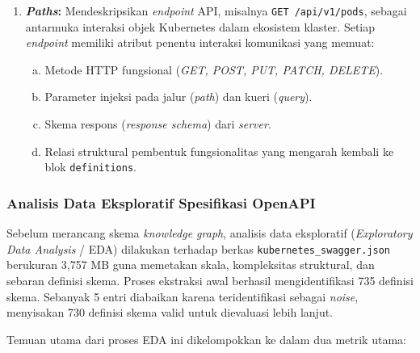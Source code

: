 \begin{enumerate}
        \item \textbf{\textit{Paths}:} Mendeskripsikan \textit{endpoint} API, misalnya \texttt{GET /api/v1/pods}, sebagai antarmuka interaksi objek Kubernetes dalam ekosistem klaster. Setiap \textit{endpoint} memiliki atribut penentu interaksi komunikasi yang memuat:
        \begin{enumerate}[a.]
            \item Metode HTTP fungsional (\textit{GET, POST, PUT, PATCH, DELETE}).
            \item Parameter injeksi pada jalur (\textit{path}) dan kueri (\textit{query}).
            \item Skema respons (\textit{response schema}) dari \textit{server}.
            \item Relasi struktural pembentuk fungsionalitas yang mengarah kembali ke blok \texttt{definitions}.
        \end{enumerate}
    \end{enumerate}

    \subsubsection{Analisis Data Eksploratif Spesifikasi OpenAPI}
    \label{subsec:eda}

        Sebelum merancang skema \textit{knowledge graph}, analisis data eksploratif (\textit{Exploratory Data Analysis} / EDA) dilakukan terhadap berkas \texttt{kubernetes\_swagger.json} berukuran 3,757 MB guna memetakan skala, kompleksitas struktural, dan sebaran definisi skema. Proses ekstraksi awal berhasil mengidentifikasi 735 definisi skema. Sebanyak 5 entri diabaikan karena teridentifikasi sebagai \textit{noise}, menyisakan 730 definisi skema valid untuk dievaluasi lebih lanjut.

        Temuan utama dari proses EDA ini dikelompokkan ke dalam dua metrik utama:

